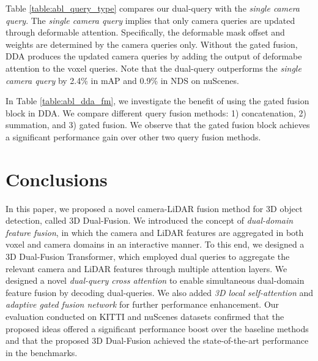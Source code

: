 \documentclass[lettersize,journal]{IEEEtran}
\begin{document}
Table \ref{table:abl_query_type} compares our dual-query with the {\it single camera query}. The {\it single camera query} implies that only camera queries are updated through deformable attention. Specifically, the deformable mask offset and weights are determined by the camera queries only. Without the gated fusion, DDA produces the updated camera queries by adding the output of deformabe attention to the voxel queries. Note that the dual-query outperforms the {\it single camera query} by 2.4\% in mAP and 0.9\% in NDS on nuScenes.

In Table \ref{table:abl_dda_fm}, we investigate the benefit of using the gated fusion block in DDA. We compare different query fusion methods: 1) concatenation, 2) summation, and 3) gated fusion. We observe that the gated fusion block achieves a significant performance gain over other two query fusion methods.



 

\section{Conclusions}
In this paper, we proposed a novel camera-LiDAR fusion method for 3D object detection, called 3D Dual-Fusion. We introduced the concept of {\it dual-domain feature fusion}, in which the camera and LiDAR features  are aggregated in both voxel and camera domains in an interactive manner. To this end, we designed a 3D Dual-Fusion Transformer, which employed dual queries to aggregate the relevant  camera and LiDAR features through multiple attention layers. We designed a novel {\it dual-query cross attention} to enable simultaneous dual-domain feature fusion by decoding dual-queries. We also added {\it 3D local self-attention} and {\it adaptive gated fusion network} for further performance enhancement. Our evaluation conducted on KITTI and nuScenes datasets confirmed that the proposed ideas offered a significant performance boost over the baseline methods and that the proposed 3D Dual-Fusion achieved the state-of-the-art performance in the benchmarks.


{


}













\vfill
\end{document}
